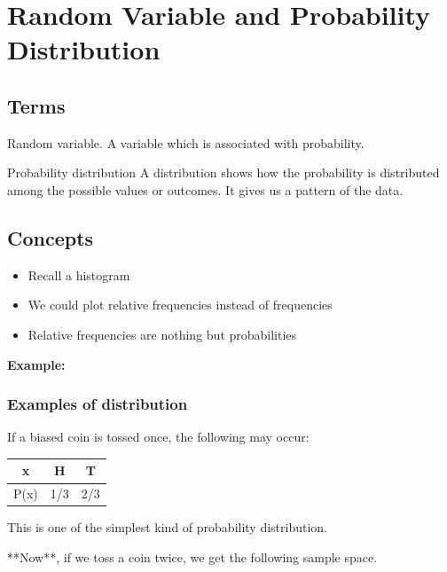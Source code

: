 \documentclass[14pt, a4paper,oneside, margin=1.4in]{book}
\begin{document}
    
\chapter{Random Variable and Probability Distribution}

\section{Terms}

\begin{worddefs}

  \item[Random variable.] A variable which is associated with probability.
  
  \item[Probability distribution] A distribution shows how the probability is distributed among the possible values or outcomes. It gives us a pattern of the data.
    
\end{worddefs}

\section{Concepts}

\begin{itemize}
  \item Recall a histogram
  \item We could plot relative frequencies instead of frequencies
  \item Relative frequencies are nothing but probabilities
\end{itemize}

\textbf{Example:}

\subsection{Examples of distribution}

If a biased coin is tossed once, the following may occur:

\begin{table}[h]
\centering
\begin{tabular}{c|c|c}
x    & H   & T   \\ \hline
P(x) & 1/3 & 2/3
\end{tabular}
\end{table}

This is one of the simplest kind of probability distribution. 

**Now**, if we toss a coin twice, we get the following sample space.
\end{document}
